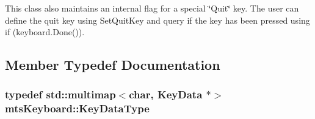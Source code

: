 This class also maintains an internal flag for a special \char`\"{}\-Quit\char`\"{} key. The user can define the quit key using Set\-Quit\-Key and query if the key has been pressed using if (keyboard.\-Done()). 

\subsection{Member Typedef Documentation}
\hypertarget{classmts_keyboard_a48126bc1793ac0b9c701cdb3cb9c3881}{
\subsubsection[{Key\-Data\-Type}]{\setlength{\rightskip}{0pt plus 5cm}typedef std\-::multimap$<$char, {\bf Key\-Data} $\ast$$>$ {\bf mts\-Keyboard\-::\-Key\-Data\-Type}\hspace{0.3cm}{\ttfamily [protected]}}}\label{classmts_keyboard_a48126bc1793ac0b9c701cdb3cb9c3881}


